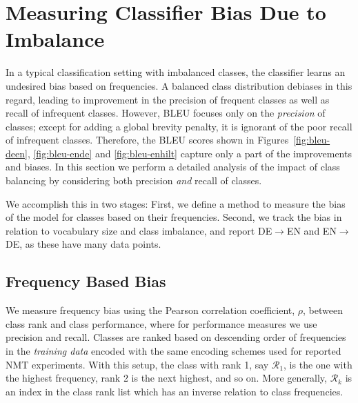 \section{Measuring Classifier Bias Due to Imbalance}
\label{sec:class-bias}

In a typical classification setting with imbalanced classes, the classifier learns an undesired bias based on frequencies.
A balanced class distribution debiases in this regard, leading to improvement in the precision of frequent classes as well as recall of infrequent classes.
However, BLEU focuses only on the \textit{precision} of classes; except for adding a global brevity penalty, it is ignorant of the poor recall of infrequent classes.
Therefore, the BLEU scores shown in Figures~\ref{fig:bleu-deen}, \ref{fig:bleu-ende} and \ref{fig:bleu-enhilt} capture only a part of the improvements and biases.
In this section we perform a detailed analysis of the impact of class balancing by considering both precision \textit{and} recall of classes.

We accomplish this in two stages:
First, we define a method to measure the bias of the model for classes based on their frequencies.
Second, we track the bias in relation to vocabulary size and class imbalance, and report DE$\rightarrow$EN and EN$\rightarrow$DE, as these have many data points.

\subsection{Frequency Based Bias}
We measure frequency bias using the Pearson correlation coefficient, $\rho$, between class rank and class performance, where for performance measures we use precision and recall.
Classes are ranked based on descending order of frequencies in the \textit{training data} encoded with the same encoding schemes used for reported NMT experiments.
With this setup, the class with rank 1, say $\mathcal{R}_1$, is the one with the highest frequency, rank 2 is the next highest, and so on.
More generally, $\mathcal{R}_k$ is an index in the class rank list which has an inverse relation to class frequencies.



